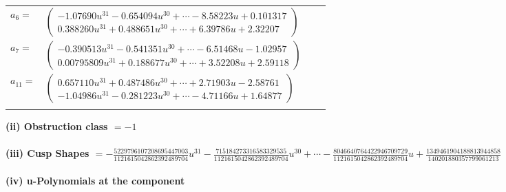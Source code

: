 \documentclass[1p]{elsarticle_modified}
\theoremstyle{definition}
\begin{document}
\begin{tabular}{m{7pt} m{180pt} m{7pt} m{180pt} }
\flushright $a_{6}=$&$\begin{pmatrix}-1.07690 u^{31}-0.654094 u^{30}+\cdots-8.58223 u+0.101317\\0.388260 u^{31}+0.488651 u^{30}+\cdots+6.39786 u+2.32207\end{pmatrix}$ \\
\flushright $a_{7}=$&$\begin{pmatrix}-0.390513 u^{31}-0.541351 u^{30}+\cdots-6.51468 u-1.02957\\0.00795809 u^{31}+0.188677 u^{30}+\cdots+3.52208 u+2.59118\end{pmatrix}$ \\
\flushright $a_{11}=$&$\begin{pmatrix}0.657110 u^{31}+0.487486 u^{30}+\cdots+2.71903 u-2.58761\\-1.04986 u^{31}-0.281223 u^{30}+\cdots-4.71166 u+1.64877\end{pmatrix}$\\&\end{tabular}
\flushleft \textbf{(ii) Obstruction class $= -1$}\\~\\
\flushleft \textbf{(iii) Cusp Shapes $= -\frac{5229796107208695447003}{1121615042862392489704} u^{31}-\frac{715184273316583329535}{1121615042862392489704} u^{30}+\cdots-\frac{8046640764422946709729}{1121615042862392489704} u+\frac{1349461904188813944858}{140201880357799061213}$}\\~\\
\newpage\renewcommand{\arraystretch}{1}
\flushleft \textbf{(iv) u-Polynomials at the component}\newline \\
\end{document}
